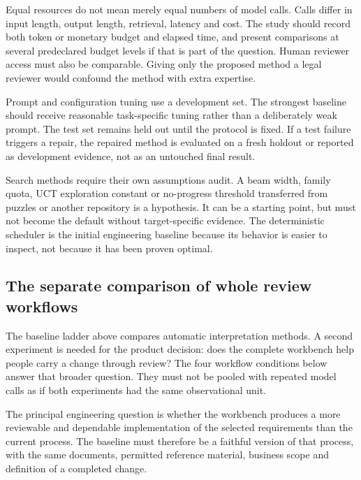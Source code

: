 \documentclass[12pt,a4paper,oneside,openany]{book}
\begin{document}
Equal resources do not mean merely equal numbers of model calls. Calls differ in
input length, output length, retrieval, latency and cost. The study should record
both token or monetary budget and elapsed time, and present comparisons at
several predeclared budget levels if that is part of the question. Human reviewer
access must also be comparable. Giving only the proposed method a legal reviewer
would confound the method with extra expertise.

Prompt and configuration tuning use a development set. The strongest baseline
should receive reasonable task-specific tuning rather than a deliberately weak
prompt. The test set remains held out until the protocol is fixed. If a test
failure triggers a repair, the repaired method is evaluated on a fresh holdout or
reported as development evidence, not as an untouched final result.

Search methods require their own assumptions audit. A beam width, family quota,
UCT exploration constant or no-progress threshold transferred from puzzles or
another repository is a hypothesis. It can be a starting point, but must not
become the default without target-specific evidence. The deterministic scheduler
is the initial engineering baseline because its behavior is easier to inspect,
not because it has been proven optimal.

\subsection{The separate comparison of whole review workflows}

The baseline ladder above compares automatic interpretation methods. A second
experiment is needed for the product decision: does the complete workbench help
people carry a change through review? The four workflow conditions below answer
that broader question. They must not be pooled with repeated model calls as if
both experiments had the same observational unit.


\label{merge:P-04-prototype:04}


The principal engineering question is whether the workbench produces a more
reviewable and dependable implementation of the selected requirements than the
current process. The baseline must therefore be a faithful version of that
process, with the same documents, permitted reference material, business scope and
definition of a completed change.
\end{document}
